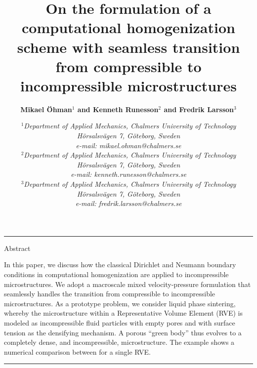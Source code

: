 \documentclass[notitlepage,a4paper,fleqn,9pt]{extarticle}
\title{\bfseries
On the formulation of a computational homogenization scheme with seamless transition from compressible to incompressible microstructures
}
\author{\normalsize\bfseries
Mikael Öhman$^1$ and Kenneth Runesson$^2$ and Fredrik Larsson$^3$
}
\date{\normalsize\vspace{-2ex}\em
$^1$Department of Applied Mechanics, Chalmers University of Technology\\
Hörsalsvägen 7, Göteborg, Sweden\\
e-mail: mikael.ohman@chalmers.se\\[1.1mm]
%
$^2$Department of Applied Mechanics, Chalmers University of Technology\\
Hörsalsvägen 7, Göteborg, Sweden\\
e-mail: kenneth.runesson@chalmers.se\\[1.1mm]
%
$^3$Department of Applied Mechanics, Chalmers University of Technology\\
Hörsalsvägen 7, Göteborg, Sweden\\
e-mail: fredrik.larsson@chalmers.se
}
\begin{document}
\raggedcolumns

\maketitle
\vspace{-3mm}
\noindent\rule{\textwidth}{.1pt}

\noindent
Abstract\\
\vspace{1ex}

\noindent 
In this paper, we discuss how the classical Dirichlet and Neumann boundary conditions in computational homogenization are applied to incompressible microstructures.
We adopt a macroscale mixed velocity-pressure formulation that seamlessly handles the transition from compressible to incompressible microstructures.
As a prototype problem, we consider liquid phase sintering, whereby the microstructure within a Representative Volume Element (RVE) is modeled as incompressible fluid particles with empty pores and with surface tension as the densifying mechanism. 
A porous ``green body'' thus evolves to a completely dense, and incompressible, microstructure.
The example shows a numerical comparison between for a single RVE.
\vspace{1ex}


\noindent\rule{\textwidth}{.1pt}
\vspace{2mm}
\end{document}
